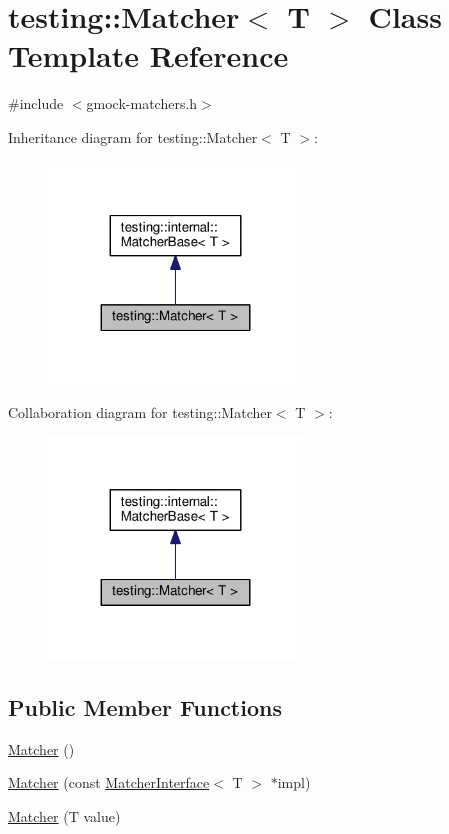 \hypertarget{classtesting_1_1Matcher}{}\section{testing\+:\+:Matcher$<$ T $>$ Class Template Reference}
\label{classtesting_1_1Matcher}


{\ttfamily \#include $<$gmock-\/matchers.\+h$>$}



Inheritance diagram for testing\+:\+:Matcher$<$ T $>$\+:\nopagebreak
\begin{figure}[H]
\begin{center}
\leavevmode
\includegraphics[width=191pt]{classtesting_1_1Matcher__inherit__graph}
\end{center}
\end{figure}


Collaboration diagram for testing\+:\+:Matcher$<$ T $>$\+:\nopagebreak
\begin{figure}[H]
\begin{center}
\leavevmode
\includegraphics[width=191pt]{classtesting_1_1Matcher__coll__graph}
\end{center}
\end{figure}
\subsection*{Public Member Functions}
\begin{DoxyCompactItemize}
\item 
\hyperlink{classtesting_1_1Matcher_a57bfc9e62d7f6acfee5ad88d1077931c}{Matcher} ()
\item 
\hyperlink{classtesting_1_1Matcher_aea32eb3f86233853de91929fb2691bf3}{Matcher} (const \hyperlink{classtesting_1_1MatcherInterface}{Matcher\+Interface}$<$ T $>$ $\ast$impl)
\item 
\hyperlink{classtesting_1_1Matcher_adc75e0bd47ffc75ba8a5f760372d0493}{Matcher} (T value)
\end{DoxyCompactItemize}
